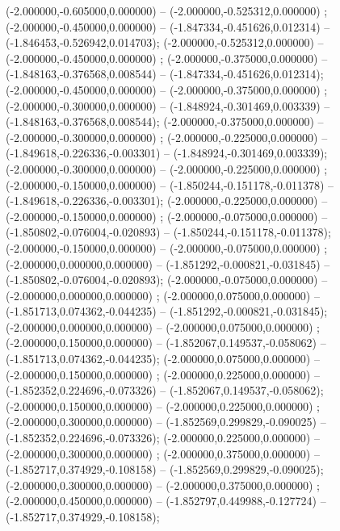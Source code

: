  (-2.000000,-0.605000,0.000000) -- (-2.000000,-0.525312,0.000000) ;
 (-2.000000,-0.450000,0.000000) -- (-1.847334,-0.451626,0.012314) -- (-1.846453,-0.526942,0.014703);
 (-2.000000,-0.525312,0.000000) -- (-2.000000,-0.450000,0.000000) ;
 (-2.000000,-0.375000,0.000000) -- (-1.848163,-0.376568,0.008544) -- (-1.847334,-0.451626,0.012314);
 (-2.000000,-0.450000,0.000000) -- (-2.000000,-0.375000,0.000000) ;
 (-2.000000,-0.300000,0.000000) -- (-1.848924,-0.301469,0.003339) -- (-1.848163,-0.376568,0.008544);
 (-2.000000,-0.375000,0.000000) -- (-2.000000,-0.300000,0.000000) ;
 (-2.000000,-0.225000,0.000000) -- (-1.849618,-0.226336,-0.003301) -- (-1.848924,-0.301469,0.003339);
 (-2.000000,-0.300000,0.000000) -- (-2.000000,-0.225000,0.000000) ;
 (-2.000000,-0.150000,0.000000) -- (-1.850244,-0.151178,-0.011378) -- (-1.849618,-0.226336,-0.003301);
 (-2.000000,-0.225000,0.000000) -- (-2.000000,-0.150000,0.000000) ;
 (-2.000000,-0.075000,0.000000) -- (-1.850802,-0.076004,-0.020893) -- (-1.850244,-0.151178,-0.011378);
 (-2.000000,-0.150000,0.000000) -- (-2.000000,-0.075000,0.000000) ;
 (-2.000000,0.000000,0.000000) -- (-1.851292,-0.000821,-0.031845) -- (-1.850802,-0.076004,-0.020893);
 (-2.000000,-0.075000,0.000000) -- (-2.000000,0.000000,0.000000) ;
 (-2.000000,0.075000,0.000000) -- (-1.851713,0.074362,-0.044235) -- (-1.851292,-0.000821,-0.031845);
 (-2.000000,0.000000,0.000000) -- (-2.000000,0.075000,0.000000) ;
 (-2.000000,0.150000,0.000000) -- (-1.852067,0.149537,-0.058062) -- (-1.851713,0.074362,-0.044235);
 (-2.000000,0.075000,0.000000) -- (-2.000000,0.150000,0.000000) ;
 (-2.000000,0.225000,0.000000) -- (-1.852352,0.224696,-0.073326) -- (-1.852067,0.149537,-0.058062);
 (-2.000000,0.150000,0.000000) -- (-2.000000,0.225000,0.000000) ;
 (-2.000000,0.300000,0.000000) -- (-1.852569,0.299829,-0.090025) -- (-1.852352,0.224696,-0.073326);
 (-2.000000,0.225000,0.000000) -- (-2.000000,0.300000,0.000000) ;
 (-2.000000,0.375000,0.000000) -- (-1.852717,0.374929,-0.108158) -- (-1.852569,0.299829,-0.090025);
 (-2.000000,0.300000,0.000000) -- (-2.000000,0.375000,0.000000) ;
 (-2.000000,0.450000,0.000000) -- (-1.852797,0.449988,-0.127724) -- (-1.852717,0.374929,-0.108158);

